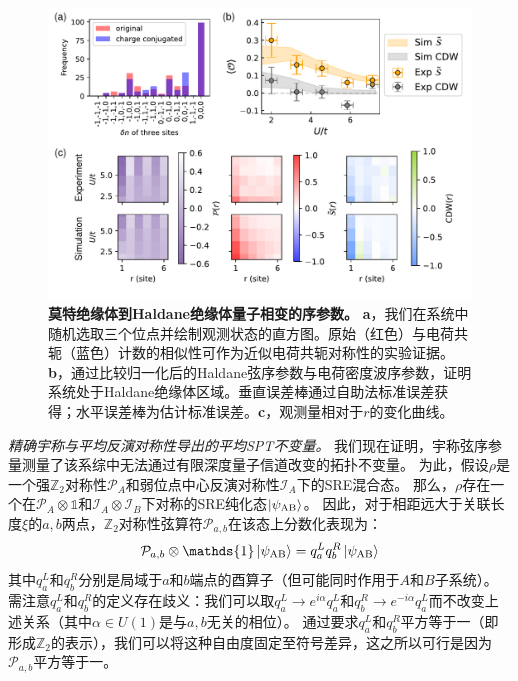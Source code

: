 \documentclass[preprint,superscriptaddress,floatfix,nofootinbib]{revtex4-2}
\begin{document}
\begin{figure}
    \centering
    \includegraphics[width=\textwidth]{figures/HI_2D_OP.pdf}
    \caption{\textbf{莫特绝缘体到Haldane绝缘体量子相变的序参数。} \textbf{a}，我们在系统中随机选取三个位点并绘制观测状态的直方图。原始（红色）与电荷共轭（蓝色）计数的相似性可作为近似电荷共轭对称性的实验证据。\textbf{b}，通过比较归一化后的Haldane弦序参数与电荷密度波序参数，证明系统处于Haldane绝缘体区域。垂直误差棒通过自助法标准误差获得；水平误差棒为估计标准误差。\textbf{c}，观测量相对于$r$的变化曲线。
    }
    \label{fig: HI_2D_OP}
\end{figure}
\textit{精确宇称与平均反演对称性导出的平均SPT不变量。} 我们现在证明，宇称弦序参量测量了该系综中无法通过有限深度量子信道改变的拓扑不变量。
为此，假设$\rho$是一个强$\mathbb{Z}_2$对称性$\mathcal{P}_A$和弱位点中心反演对称性$\mathcal{I}_A$下的SRE混合态。
那么，$\rho$存在一个在$\mathcal{P}_A \otimes \mathds{1}$和$\mathcal{I}_A \otimes \mathcal{I}_B$下对称的SRE纯化态$\ket{\psi_{\text{AB}}}$。
因此，对于相距远大于关联长度$\xi$的$a, b$两点，$\mathbb{Z}_2$对称性弦算符$\mathcal{P}_{a, b}$在该态上分数化表现为：
\begin{equation}
    \mathcal{P}_{a, b} \otimes \mathds{1} \ket{\psi_{\text{AB}}} = q^L_a q^R_b \ket{\psi_{\text{AB}}}
\end{equation}
其中$q^L_a$和$q^R_b$分别是局域于$a$和$b$端点的酉算子（但可能同时作用于$A$和$B$子系统）。
需注意$q^L_a$和$q^R_b$的定义存在歧义：我们可以取$q_{a}^L \to e^{i \alpha} q_a^{L}$和$q_{b}^{R} \to e^{-i \alpha} q_a^{L}$而不改变上述关系（其中$\alpha \in U(1)$是与$a, b$无关的相位）。
通过要求$q_a^L$和$q_b^R$平方等于一（即形成$\mathbb{Z}_2$的表示），我们可以将这种自由度固定至符号差异，这之所以可行是因为$\mathcal{P}_{a, b}$平方等于一。
\end{document}
